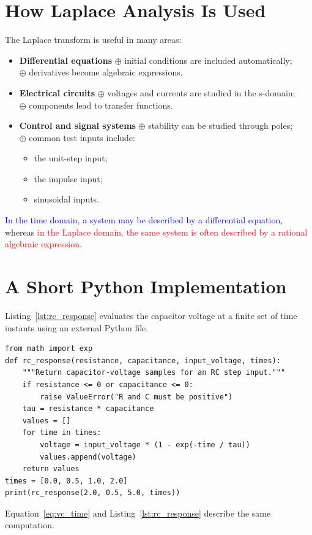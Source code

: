 \documentclass{article}
\begin{document}
\section{How Laplace Analysis Is Used}
The Laplace transform is useful in many areas:
\begin{itemize}[leftmargin=*,label=]
    \item \textbf{Differential equations} $\oplus$ initial conditions are included automatically; \\
$\oplus$ derivatives become algebraic expressions.
    \item \textbf{Electrical circuits} $\oplus$ voltages and currents are studied in the s-domain; \\
$\oplus$ components lead to transfer functions.
    \item \textbf{Control and signal systems} $\oplus$ stability can be studied through poles; \\
$\oplus$ common test inputs include:
        \begin{itemize}
            \item[$\rhd$]  the unit-step input;
            \item[$\rhd$]  the impulse input;
            \item[$\rhd$]  sinusoidal inputs.
        \end{itemize}
\end{itemize}
\textcolor{blue}{In the time domain, a system may be described by a differential equation}, whereas \textcolor{red}{in the Laplace
domain, the same system is often described by a rational algebraic expression.}
\section{A Short Python Implementation}
Listing~\ref{lst:rc_response} evaluates the capacitor voltage at a finite set of time instants using an external Python
file.
\begin{listing}[ht]
\begin{verbatim}
from math import exp
def rc_response(resistance, capacitance, input_voltage, times):
    """Return capacitor-voltage samples for an RC step input."""
    if resistance <= 0 or capacitance <= 0:
        raise ValueError("R and C must be positive")
    tau = resistance * capacitance
    values = []
    for time in times:
        voltage = input_voltage * (1 - exp(-time / tau))
        values.append(voltage)
    return values
times = [0.0, 0.5, 1.0, 2.0]
print(rc_response(2.0, 0.5, 5.0, times))
\end{verbatim}
\caption{Computing samples of the RC step response.}
\label{lst:rc_response}
\end{listing}
Equation~\eqref{eq:vc_time} and Listing~\ref{lst:rc_response} describe the same computation.



\end{document}
